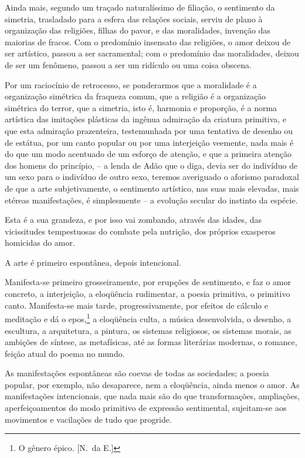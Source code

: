 Ainda mais, segundo um traçado naturalíssimo de filiação, o sentimento da
simetria, trasladado para a esfera das relações sociais, serviu de
plano à organização das religiões, filhas do pavor, e das moralidades,
invenção das maiorias de fracos. Com o predomínio insensato das
religiões, o amor deixou de ser artístico, passou a ser sacramental;
com o predomínio das moralidades, deixou de ser um fenômeno, passou a
ser um ridículo ou uma coisa obscena. 

Por um raciocínio de retrocesso,
se ponderarmos que a moralidade é a organização simétrica da fraqueza
comum, que a religião é a organização simétrica do terror, que a
simetria, isto é, harmonia e proporção, é a norma artística das
imitações plásticas da ingênua admiração da criatura primitiva, e que
esta admiração prazenteira, testemunhada por uma tentativa de desenho
ou de estátua, por um canto popular ou por uma interjeição veemente,
nada mais é do que um modo acentuado de um esforço de atenção, e que a
primeira atenção dos homens do princípio, -- a lenda de Adão que o
diga, devia ser do indivíduo de um sexo para o indivíduo de outro sexo,
teremos averiguado o aforismo paradoxal de que a arte subjetivamente, o
sentimento artístico, nas suas mais elevadas, mais etéreas
manifestações, é simplesmente -- a evolução secular do instinto da
espécie. 

Esta é a sua grandeza, e por isso vai zombando, através das
idades, das vicissitudes tempestuosas do combate pela nutrição, dos
próprios exasperos homicidas do amor. 

A arte é primeiro espontânea, depois intencional. 

Manifesta{}-se primeiro grosseiramente, por
erupções de sentimento, e faz o amor concreto, a interjeição, a
eloqüência rudimentar, a poesia primitiva, o primitivo canto.
Manifesta{}-se mais tarde, progressivamente, por efeitos de cálculo e
meditação e dá o epos,\footnote{ O gênero épico. [N.~da E.]} a eloqüência 
culta, a música desenvolvida, o
desenho, a escultura, a arquitetura, a pintura, os sistemas religiosos,
os sistemas morais, as ambições de síntese, as metafísicas, até as
formas literárias modernas, o romance, feição atual do poema no mundo.

As manifestações espontâneas são coevas de todas as sociedades; a poesia
popular, por exemplo, não desaparece, nem a eloqüência, ainda menos o
amor. As manifestações intencionais, que nada mais são do que
transformações, ampliações, aperfeiçoamentos do modo primitivo de
expressão sentimental, sujeitam{}-se aos movimentos e vacilações de
tudo que progride. 

